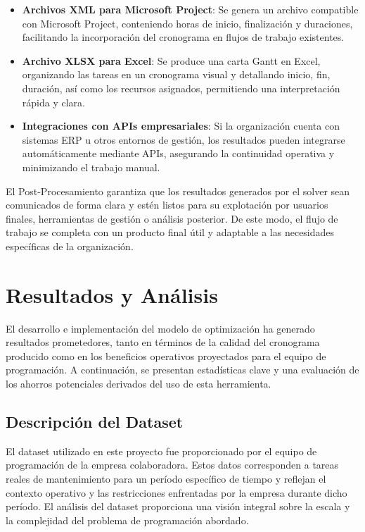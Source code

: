 \documentclass{article}
\begin{document}
\begin{itemize}
    \item \textbf{Archivos XML para Microsoft Project}: Se genera un archivo compatible con Microsoft Project, conteniendo horas de inicio, finalización y duraciones, facilitando la incorporación del cronograma en flujos de trabajo existentes.

    \item \textbf{Archivo XLSX para Excel}: Se produce una carta Gantt en Excel, organizando las tareas en un cronograma visual y detallando inicio, fin, duración, así como los recursos asignados, permitiendo una interpretación rápida y clara.

    \item \textbf{Integraciones con APIs empresariales}: Si la organización cuenta con sistemas ERP u otros entornos de gestión, los resultados pueden integrarse automáticamente mediante APIs, asegurando la continuidad operativa y minimizando el trabajo manual.
\end{itemize}

El Post-Procesamiento garantiza que los resultados generados por el solver sean comunicados de forma clara y estén listos para su explotación por usuarios finales, herramientas de gestión o análisis posterior. De este modo, el flujo de trabajo se completa con un producto final útil y adaptable a las necesidades específicas de la organización.

\section{Resultados y Análisis}

El desarrollo e implementación del modelo de optimización ha generado resultados prometedores, tanto en términos de la calidad del cronograma producido como en los beneficios operativos proyectados para el equipo de programación. A continuación, se presentan estadísticas clave y una evaluación de los ahorros potenciales derivados del uso de esta herramienta.


\subsection{Descripción del Dataset}

El dataset utilizado en este proyecto fue proporcionado por el equipo de programación de la empresa colaboradora. Estos datos corresponden a tareas reales de mantenimiento para un período específico de tiempo y reflejan el contexto operativo y las restricciones enfrentadas por la empresa durante dicho período. El análisis del dataset proporciona una visión integral sobre la escala y la complejidad del problema de programación abordado.
\end{document}

